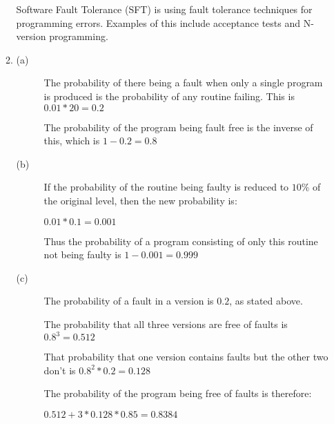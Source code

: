 \documentclass[a4paper,12pt]{article}
\begin{document}
\begin{enumerate}
\begin{enumerate}
                Software Fault Tolerance (SFT) is using fault tolerance techniques for programming errors. Examples of this include acceptance tests and N-version programming.

                \item
                    \begin{description}
                        \item[(a)] The probability of there being a fault when only a single program is produced is the probability of any routine failing. This is $0.01 * 20 = 0.2$

                        The probability of the program being fault free is the inverse of this, which is $1 - 0.2 = 0.8$

                        \item[(b)] If the probability of the routine being faulty is reduced to $10\%$ of the original level, then the new probability is:

                        $0.01 * 0.1 = 0.001$

                        Thus the probability of a program consisting of only this routine not being faulty is $1 - 0.001 = 0.999$

                        \item[(c)] The probability of a fault in a version is $0.2$, as stated above.

                        The probability that all three versions are free of faults is $0.8^3 = 0.512$

                        That probability that one version contains faults but the other two don't is $0.8^2*0.2 = 0.128$

                        The probability of the program being free of faults is therefore:

                        $0.512 + 3 * 0.128 * 0.85 = 0.8384$
                    \end{description}
            \end{enumerate}

    \end{enumerate}
\end{document}
